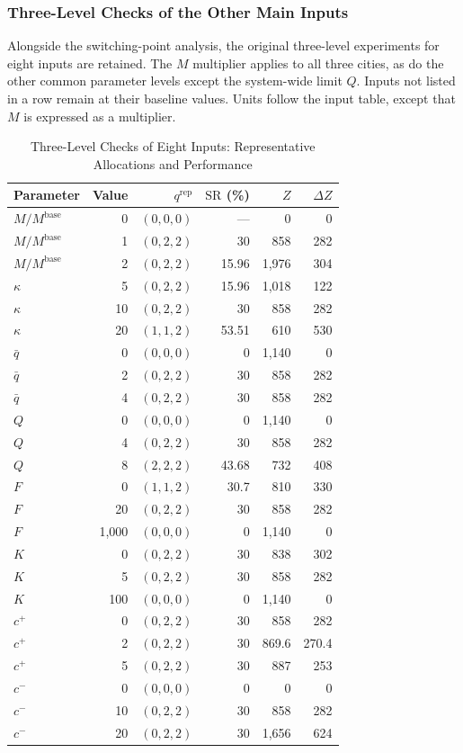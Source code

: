 \documentclass[10pt,a4paper]{article}
\begin{document}
\subsubsection{Three-Level Checks of the Other Main Inputs}
Alongside the switching-point analysis, the original three-level experiments for eight inputs are retained. The $M$ multiplier applies to all three cities, as do the other common parameter levels except the system-wide limit $Q$. Inputs not listed in a row remain at their baseline values. Units follow the input table, except that $M$ is expressed as a multiplier.
\begin{table}[H]
\centering\small
\caption{Three-Level Checks of Eight Inputs: Representative Allocations and Performance}\label{tab:sc-original24}
\begin{tabular}{lrrrrr}
\toprule
Parameter & Value & $q^{\mathrm{rep}}$ & $\mathrm{SR}$ (\%) & $Z$ & $\Delta Z$\\\midrule
$M/M^{\mathrm{base}}$ & 0 & $(0,0,0)$ & --- & 0 & 0\\
$M/M^{\mathrm{base}}$ & 1 & $(0,2,2)$ & 30 & 858 & 282\\
$M/M^{\mathrm{base}}$ & 2 & $(0,2,2)$ & 15.96 & 1,976 & 304\\
$\kappa$ & 5 & $(0,2,2)$ & 15.96 & 1,018 & 122\\
$\kappa$ & 10 & $(0,2,2)$ & 30 & 858 & 282\\
$\kappa$ & 20 & $(1,1,2)$ & 53.51 & 610 & 530\\
$\bar q$ & 0 & $(0,0,0)$ & 0 & 1,140 & 0\\
$\bar q$ & 2 & $(0,2,2)$ & 30 & 858 & 282\\
$\bar q$ & 4 & $(0,2,2)$ & 30 & 858 & 282\\
$Q$ & 0 & $(0,0,0)$ & 0 & 1,140 & 0\\
$Q$ & 4 & $(0,2,2)$ & 30 & 858 & 282\\
$Q$ & 8 & $(2,2,2)$ & 43.68 & 732 & 408\\
$F$ & 0 & $(1,1,2)$ & 30.7 & 810 & 330\\
$F$ & 20 & $(0,2,2)$ & 30 & 858 & 282\\
$F$ & 1,000 & $(0,0,0)$ & 0 & 1,140 & 0\\
$K$ & 0 & $(0,2,2)$ & 30 & 838 & 302\\
$K$ & 5 & $(0,2,2)$ & 30 & 858 & 282\\
$K$ & 100 & $(0,0,0)$ & 0 & 1,140 & 0\\
$c^+$ & 0 & $(0,2,2)$ & 30 & 858 & 282\\
$c^+$ & 2 & $(0,2,2)$ & 30 & 869.6 & 270.4\\
$c^+$ & 5 & $(0,2,2)$ & 30 & 887 & 253\\
$c^-$ & 0 & $(0,0,0)$ & 0 & 0 & 0\\
$c^-$ & 10 & $(0,2,2)$ & 30 & 858 & 282\\
$c^-$ & 20 & $(0,2,2)$ & 30 & 1,656 & 624\\
\bottomrule
\end{tabular}
\end{table}
\end{document}
